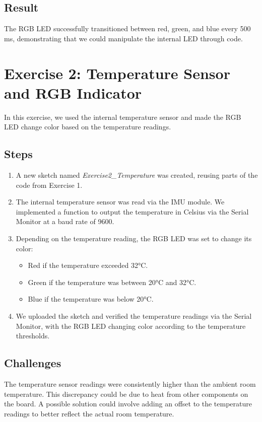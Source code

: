 \documentclass[a4paper,12pt]{article}
\begin{document}
	\subsection{Result}
	The RGB LED successfully transitioned between red, green, and blue every 500 ms, demonstrating that we could manipulate the internal LED through code.
	
	\section{Exercise 2: Temperature Sensor and RGB Indicator}
	In this exercise, we used the internal temperature sensor and made the RGB LED change color based on the temperature readings.
	
	\subsection{Steps}
	\begin{enumerate}
		\item A new sketch named \textit{Exercise2\_Temperature} was created, reusing parts of the code from Exercise 1.
		\item The internal temperature sensor was read via the IMU module. We implemented a function to output the temperature in Celsius via the Serial Monitor at a baud rate of 9600.
		\item Depending on the temperature reading, the RGB LED was set to change its color:
		\begin{itemize}
			\item Red if the temperature exceeded 32°C.
			\item Green if the temperature was between 20°C and 32°C.
			\item Blue if the temperature was below 20°C.
		\end{itemize}
		\item We uploaded the sketch and verified the temperature readings via the Serial Monitor, with the RGB LED changing color according to the temperature thresholds.
	\end{enumerate}
	
	\subsection{Challenges}
	The temperature sensor readings were consistently higher than the ambient room temperature. This discrepancy could be due to heat from other components on the board. A possible solution could involve adding an offset to the temperature readings to better reflect the actual room temperature.
	
\end{document}
